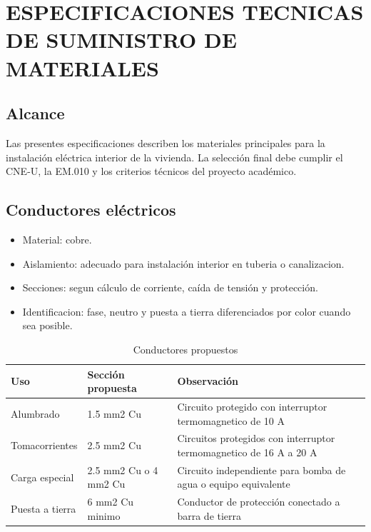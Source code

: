 \chapter{ESPECIFICACIONES TECNICAS DE SUMINISTRO DE MATERIALES}

\section{Alcance}

Las presentes especificaciones describen los materiales principales para la instalación eléctrica interior de la vivienda. La selección final debe cumplir el CNE-U, la EM.010 y los criterios técnicos del proyecto académico.

\section{Conductores eléctricos}

\begin{itemize}
  \item Material: cobre.
  \item Aislamiento: adecuado para instalación interior en tuberia o canalizacion.
  \item Secciones: segun cálculo de corriente, caída de tensión y protección.
  \item Identificacion: fase, neutro y puesta a tierra diferenciados por color cuando sea posible.
\end{itemize}

\begin{landscape}
\begin{table}[H]
\centering
\small
\caption{Conductores propuestos}
\label{tab:conductores-propuestos}
\begin{tabularx}{\textwidth}{L{3.4cm}L{3.3cm}Y}
\toprule
\textbf{Uso} & \textbf{Sección propuesta} & \textbf{Observación} \\
\midrule
Alumbrado & 1.5 mm2 Cu & Circuito protegido con interruptor termomagnetico de 10 A \\
Tomacorrientes & 2.5 mm2 Cu & Circuitos protegidos con interruptor termomagnetico de 16 A a 20 A \\
Carga especial & 2.5 mm2 Cu o 4 mm2 Cu & Circuito independiente para bomba de agua o equipo equivalente \\
Puesta a tierra & 6 mm2 Cu minimo & Conductor de protección conectado a barra de tierra \\
\bottomrule
\end{tabularx}
\end{table}
\end{landscape}

